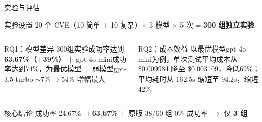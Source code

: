 \begin{frame}{实验与评估}
    \scriptsize
    \begin{block}{实验设置}
        20 个 CVE（10 简单 + 10 复杂）$\times$ 3 模型 $\times$ 5 次 = \textbf{300 组独立实验}
    \end{block}

    \begin{columns}
        \begin{exampleblock}{RQ1：模型差异}
            300组实验成功率达到\textbf{63.67\%（+39\%）} $\;|\;$ gpt-4o-mini成功率达到74\%，为最优模型 $\;|\;$ 弱模型gpt-3.5-turbo $\sim$7\%$\to$54\% 增幅最大
        \end{exampleblock}

        \begin{exampleblock}{RQ2：成本效益}
            以最优模型gpt-4o-mini为例，单次测试平均成本从\$0.009984 降至 \$0.003109，降低69\%；平均耗时从 162.5s 缩短至 94.2s，缩短42\%
        \end{exampleblock}
    \end{columns}

    \vspace{0.3em}
    \begin{exampleblock}{核心结论}
        成功率 24.67\%$\to$\textbf{63.67\%} $\;|\;$ 原版 38/60 组 0\% 成功率 $\to$ 仅 \textbf{3 组}
    \end{exampleblock}
\end{frame}

